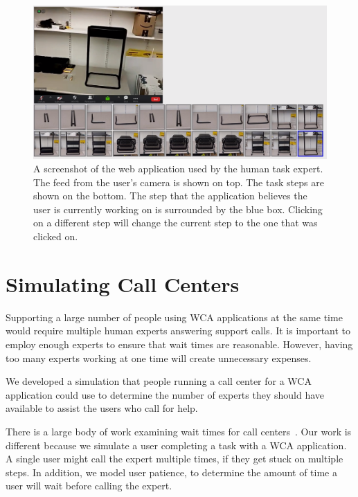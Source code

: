 \begin{figure}[h]
  \includegraphics[width=\textwidth]{figures/expert_ui.png}
  \caption[A screenshot of the web application used by the human task expert]{
    A screenshot of the web application used by the human task expert.
    The feed from the user's camera is shown on top.
    The task steps are shown on the bottom.
    The step that the application believes the user is currently working on is
    surrounded by the blue box.
    Clicking on a different step will change the current step to the one that
    was clicked on.
  }\label{fig:expertui}
\end{figure}

\pagebreak

\section{Simulating Call Centers}

Supporting a large number of people using WCA applications at the same time
would require multiple human experts answering support calls.
It is important to employ enough experts to ensure that wait times are
reasonable.
However, having too many experts working at one time will create unnecessary
expenses.

We developed a simulation that people running a call center for a WCA
application could use to determine the number of experts they should have
available to assist the users who call for help.

There is a large body of work examining wait times for call
centers~\cite{queue1, queue2}.
Our work is different because we simulate a user completing a task with a WCA
application.
A single user might call the expert multiple times, if they get stuck on
multiple steps.
In addition, we model user patience, to determine the amount of time a user will
wait before calling the expert.

